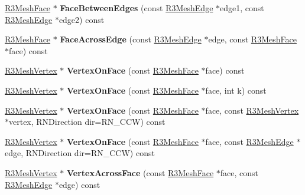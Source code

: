 \begin{DoxyCompactItemize}
\item 
\hyperlink{class_r3_mesh_face}{R3\+Mesh\+Face} $\ast$ {\bfseries Face\+Between\+Edges} (const \hyperlink{class_r3_mesh_edge}{R3\+Mesh\+Edge} $\ast$edge1, const \hyperlink{class_r3_mesh_edge}{R3\+Mesh\+Edge} $\ast$edge2) const \hypertarget{class_r3_mesh_acdd820997ed3cb342f7c482a6a2bc65b}{}\label{class_r3_mesh_acdd820997ed3cb342f7c482a6a2bc65b}

\item 
\hyperlink{class_r3_mesh_face}{R3\+Mesh\+Face} $\ast$ {\bfseries Face\+Across\+Edge} (const \hyperlink{class_r3_mesh_edge}{R3\+Mesh\+Edge} $\ast$edge, const \hyperlink{class_r3_mesh_face}{R3\+Mesh\+Face} $\ast$face) const \hypertarget{class_r3_mesh_af52ad50c91110355d51846b68c300fb5}{}\label{class_r3_mesh_af52ad50c91110355d51846b68c300fb5}

\item 
\hyperlink{class_r3_mesh_vertex}{R3\+Mesh\+Vertex} $\ast$ {\bfseries Vertex\+On\+Face} (const \hyperlink{class_r3_mesh_face}{R3\+Mesh\+Face} $\ast$face) const \hypertarget{class_r3_mesh_aec4fc451aa6d843d9e3948feaa03eb37}{}\label{class_r3_mesh_aec4fc451aa6d843d9e3948feaa03eb37}

\item 
\hyperlink{class_r3_mesh_vertex}{R3\+Mesh\+Vertex} $\ast$ {\bfseries Vertex\+On\+Face} (const \hyperlink{class_r3_mesh_face}{R3\+Mesh\+Face} $\ast$face, int k) const \hypertarget{class_r3_mesh_a925d0630166db441b03e7e80b9b2b35c}{}\label{class_r3_mesh_a925d0630166db441b03e7e80b9b2b35c}

\item 
\hyperlink{class_r3_mesh_vertex}{R3\+Mesh\+Vertex} $\ast$ {\bfseries Vertex\+On\+Face} (const \hyperlink{class_r3_mesh_face}{R3\+Mesh\+Face} $\ast$face, const \hyperlink{class_r3_mesh_vertex}{R3\+Mesh\+Vertex} $\ast$vertex, R\+N\+Direction dir=R\+N\+\_\+\+C\+CW) const \hypertarget{class_r3_mesh_a74dc2b9e4d96f0b1a4836034023f3cd8}{}\label{class_r3_mesh_a74dc2b9e4d96f0b1a4836034023f3cd8}

\item 
\hyperlink{class_r3_mesh_vertex}{R3\+Mesh\+Vertex} $\ast$ {\bfseries Vertex\+On\+Face} (const \hyperlink{class_r3_mesh_face}{R3\+Mesh\+Face} $\ast$face, const \hyperlink{class_r3_mesh_edge}{R3\+Mesh\+Edge} $\ast$edge, R\+N\+Direction dir=R\+N\+\_\+\+C\+CW) const \hypertarget{class_r3_mesh_a82644cea813859913144d0d0298313e6}{}\label{class_r3_mesh_a82644cea813859913144d0d0298313e6}

\item 
\hyperlink{class_r3_mesh_vertex}{R3\+Mesh\+Vertex} $\ast$ {\bfseries Vertex\+Across\+Face} (const \hyperlink{class_r3_mesh_face}{R3\+Mesh\+Face} $\ast$face, const \hyperlink{class_r3_mesh_edge}{R3\+Mesh\+Edge} $\ast$edge) const \hypertarget{class_r3_mesh_a86d673e0c9d87e367cc258806d36cc1f}{}\label{class_r3_mesh_a86d673e0c9d87e367cc258806d36cc1f}


\end{DoxyCompactItemize}

